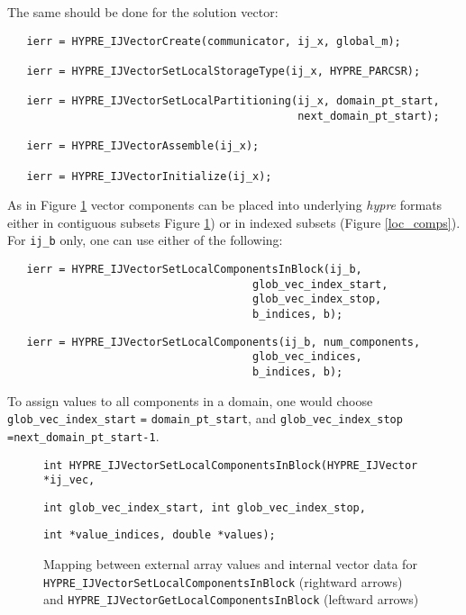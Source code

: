\noindent The same should be done for the solution vector:

\begin{verbatim}
   ierr = HYPRE_IJVectorCreate(communicator, ij_x, global_m);

   ierr = HYPRE_IJVectorSetLocalStorageType(ij_x, HYPRE_PARCSR);

   ierr = HYPRE_IJVectorSetLocalPartitioning(ij_x, domain_pt_start,
                                             next_domain_pt_start);

   ierr = HYPRE_IJVectorAssemble(ij_x);

   ierr = HYPRE_IJVectorInitialize(ij_x);
\end{verbatim}

\noindent As in Figure \ref{loc_comps_blk} vector components
can be placed into underlying {\slshape hypre} formats either
in contiguous subsets Figure \ref{loc_comps_blk}) or in
indexed subsets (Figure \ref{loc_comps}). For \verb+ij_b+ only,
one can use either of the following:

\begin{verbatim}
   ierr = HYPRE_IJVectorSetLocalComponentsInBlock(ij_b,
                                      glob_vec_index_start,
                                      glob_vec_index_stop,
                                      b_indices, b);
\end{verbatim}
\begin{verbatim}
   ierr = HYPRE_IJVectorSetLocalComponents(ij_b, num_components,
                                      glob_vec_indices,
                                      b_indices, b);
\end{verbatim}

\noindent To assign values to all components in a domain, one would
choose \verb+glob_vec_index_start+ \verb+=+ \verb+domain_pt_start+,
and \verb+glob_vec_index_stop+ \verb+=+\verb+next_domain_pt_start-1+.

\begin{figure}
\label{loc_comps_blk}
\centerline{}
\parbox{6.5in}{\hspace{1in}
  {\tt int HYPRE\_IJVectorSetLocalComponentsInBlock(HYPRE\_IJVector *ij\_vec,}}
\parbox{6.5in}{\hspace{2in}
  {\tt int glob\_vec\_index\_start, int glob\_vec\_index\_stop,}}
\parbox{6.5in}{\hspace{2in}
  {\tt int *value\_indices, double *values);}}
\caption{Mapping between external array values and
  internal vector data for
  {\tt HYPRE\_IJVectorSet\linebreak[0]LocalComponentsInBlock}
  (rightward arrows) and
  {\tt HYPRE\_IJVectorGet\linebreak[0]LocalComponentsInBlock}
  (leftward arrows)}
\end{figure}

